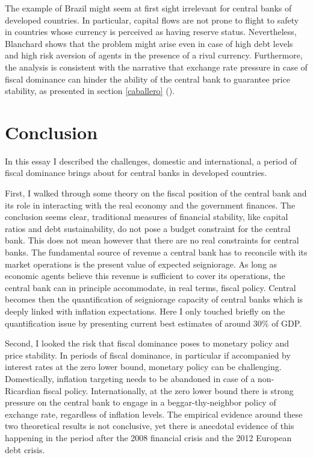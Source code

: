 \documentclass[american]{scrartcl}
\begin{document}
The example of Brazil might seem at first sight irrelevant for central banks of developed countries. In particular, capital flows are not prone to flight to safety in countries whose currency is perceived as having reserve status. Nevertheless, Blanchard shows that the problem might arise even in case of high debt levels and high risk aversion of agents in the presence of a rival currency. Furthermore, the analysis is consistent with the narrative that exchange rate pressure in case of fiscal dominance can hinder the ability of the central bank to guarantee price stability, as presented in section \ref{caballero} (\cite{Caballero2016}).

\section{Conclusion}

In this essay I described the challenges, domestic and international, a period of fiscal dominance brings about for central banks in developed countries.

First, I walked through some theory on the fiscal position of the central bank and its role in interacting with the real economy and the government finances. The conclusion seems clear, traditional measures of financial stability, like capital ratios and debt sustainability, do not pose a budget constraint for the central bank. This does not mean however that there are no real constraints for central banks. The fundamental source of revenue a central bank has to reconcile with its market operations is the present value of expected seigniorage. As long as economic agents believe this revenue is sufficient to cover its operations, the central bank can in principle accommodate, in real terms, fiscal policy. Central becomes then the quantification of seigniorage capacity of central banks which is deeply linked with inflation expectations. Here I only touched briefly on the quantification issue by presenting current best estimates of around 30\% of GDP.

Second, I looked the risk that fiscal dominance poses to monetary policy and price stability. In periods of fiscal dominance, in particular if accompanied by interest rates at the zero lower bound, monetary policy can be challenging. Domestically, inflation targeting needs to be abandoned in case of a non-Ricardian fiscal policy. Internationally, at the zero lower bound there is strong pressure on the central bank to engage in a beggar-thy-neighbor policy of exchange rate, regardless of inflation levels. The empirical evidence around these two theoretical results is not conclusive, yet there is anecdotal evidence of this happening in the period after the 2008 financial crisis and the 2012 European debt crisis.
\end{document}
